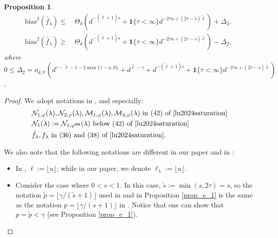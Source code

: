 \documentclass{article}
\theoremstyle{plain}
\newtheorem{proposition}[theorem]{Proposition}
\theoremstyle{definition}
\theoremstyle{remark}
\newcommand*{\krr}{\mathtt{KRR}}
\begin{document}
\begin{appendix}
\begin{proposition}
    \begin{equation*}
\begin{aligned}
    \mathrm{bias}^{2}(\hat{f}_{\lambda})  \leq  &~
    \Theta_d\left( 
    d^{-(\tilde{\ell} + 1)  s}
+ \mathbf{1}\{\tau<\infty\} d^{-2  \tau  u + (2  \tau - \tilde{s})  \tilde{\ell}} 
\right) 
    + 
    \Delta_2,\\
    \mathrm{bias}^{2}(\hat{f}_{\lambda})  \geq  &~
    \Theta_d\left( 
    d^{-(\tilde{\ell} + 1)  s}
+ \mathbf{1}\{\tau<\infty\} d^{-2  \tau  u + (2  \tau - \tilde{s})  \tilde{\ell}}
\right) 
    -
    \Delta_2,
\end{aligned} 
\end{equation*}
where $0 \leq \Delta_2 = o_{d, \mathbb{P}} \left(
d^{\gamma - \tilde{\ell} - 1 - 2  \max\{\gamma - u, 0\}}
+ d^{\tilde{\ell} - \gamma}
+ d^{-(\tilde{\ell} + 1)  s}
+ \mathbf{1}\{\tau<\infty\} d^{-2  \tau  u + (2  \tau - \tilde{s})  \tilde{\ell}}
\right)$.

\end{proposition}
\begin{proof} 
We adopt notations in \cite{lu2024saturation}, and especially:
   \begin{align*}
       &~ \mathcal{N}_{1, \varphi}(\lambda), \mathcal{N}_{2, \varphi}(\lambda), \mathcal{M}_{1, \varphi}(\lambda), 
       \mathcal{M}_{2, \varphi}(\lambda) \text{ in (42) of \cite{lu2024saturation}}\\
       &~ \mathcal{N}_{1}(\lambda) := \mathcal{N}_{1, \varphi^{\krr}}(\lambda) \text{ below (42) of \cite{lu2024saturation}}\\
       &~ \tilde{f}_{\lambda}, f_{\lambda} \text{ in (36) and (38) of \cite{lu2024saturation}}.
   \end{align*}

We also note that the following notations are different in our paper and in \cite{lu2024saturation, zhang2024optimal}:
\begin{itemize}
    \item In \cite{lu2024saturation}, $\ell:=\lfloor u \rfloor$; while in our paper, we denote $\ell_{\lambda}:=\lfloor u \rfloor$.

    \item 
    Consider the case where $0<s<1$. 
    In this case,  $\tilde{s}:=\min(s, 2\tau)=s$, so the notation $\tilde{p} = \lfloor \gamma / (\tilde{s}+1) \rfloor$ used in \cite{zhang2024optimal} and in Proposition \ref{prop_e_1} is the same as the notation $p = \lfloor \gamma / (s+1) \rfloor$ in \cite{lu2024saturation}.
    Notice that one can show that $p= \tilde{p} < \gamma$ (see Proposition \ref{prop_e_1}).


\end{itemize}
\end{proof}
\end{appendix}
\end{document}
